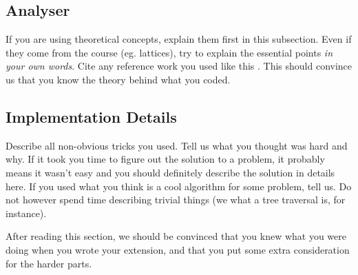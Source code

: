\subsection{Analyser}



If you are using theoretical concepts, explain them first in this subsection.
Even if they come from the course (eg. lattices), try to explain the essential
points \emph{in your own words}. Cite any reference work you used like this
\cite{lamport94}. This should convince us that you know the theory behind what
you coded. 

\subsection{Implementation Details}
Describe all non-obvious tricks you used. Tell us what you thought was hard and
why. If it took you time to figure out the solution to a problem, it probably
means it wasn't easy and you should definitely describe the solution in details
here. If you used what you think is a cool algorithm for some problem, tell us.
Do not however spend time describing trivial things (we what a tree traversal
is, for instance). 

After reading this section, we should be convinced that you knew what you were
doing when you wrote your extension, and that you put some extra consideration
for the harder parts.

